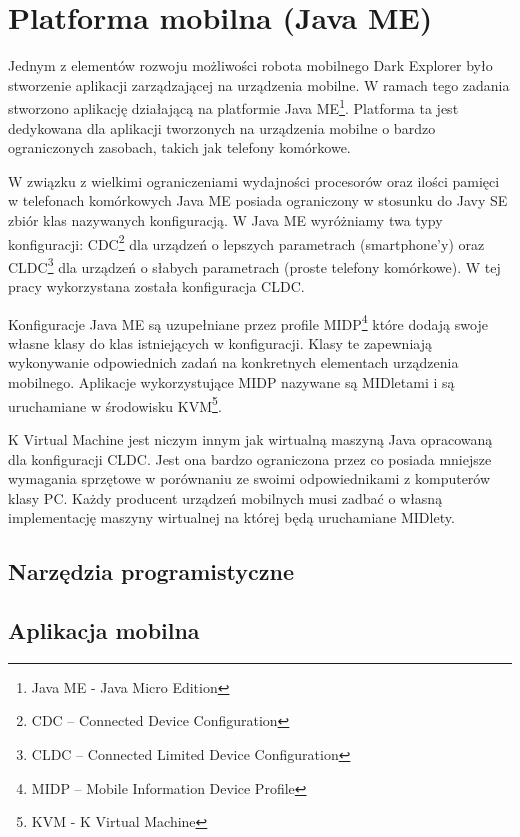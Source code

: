 \section{Platforma mobilna (Java ME)}
Jednym z elementów rozwoju możliwości robota mobilnego Dark Explorer było stworzenie aplikacji zarządzającej na urządzenia mobilne. W ramach tego zadania stworzono aplikację działającą na platformie Java ME\footnote{Java ME - Java Micro Edition}. Platforma ta jest dedykowana dla aplikacji tworzonych na urządzenia mobilne o bardzo ograniczonych zasobach, takich jak telefony komórkowe. 

W związku z wielkimi ograniczeniami wydajności procesorów oraz ilości pamięci w telefonach komórkowych Java ME posiada ograniczony w stosunku do Javy SE zbiór klas nazywanych konfiguracją. W Java ME wyróżniamy twa typy konfiguracji: CDC\footnote{CDC -- Connected Device Configuration} dla urządzeń o lepszych parametrach (smartphone'y) oraz CLDC\footnote{CLDC -- Connected Limited Device Configuration} dla urządzeń o słabych parametrach (proste telefony komórkowe). W tej pracy wykorzystana została konfiguracja CLDC.

Konfiguracje Java ME są uzupełniane przez profile MIDP\footnote{MIDP -- Mobile Information Device Profile} które dodają swoje własne klasy do klas istniejących w konfiguracji. Klasy te zapewniają wykonywanie odpowiednich zadań na konkretnych elementach urządzenia mobilnego. Aplikacje wykorzystujące MIDP nazywane są MIDletami i są uruchamiane w środowisku KVM\footnote{KVM - K Virtual Machine}.

K Virtual Machine jest niczym innym jak wirtualną maszyną Java opracowaną dla konfiguracji CLDC. Jest ona bardzo ograniczona przez co posiada mniejsze wymagania sprzętowe w porównaniu ze swoimi odpowiednikami z komputerów klasy PC.
Każdy producent urządzeń mobilnych musi zadbać o własną implementację maszyny wirtualnej na której będą uruchamiane MIDlety.
\subsection{Narzędzia programistyczne}

\subsection{Aplikacja mobilna}